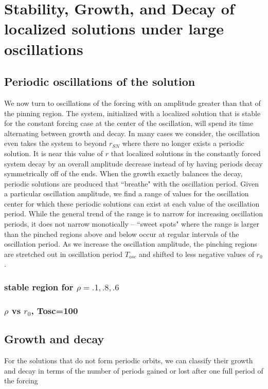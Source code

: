 \documentclass[../main/TimeForcingSHE.tex]{subfiles}
\begin{document}
\section{Stability, Growth, and Decay of localized solutions under large oscillations }
\subsection{Periodic oscillations of the solution}

We now turn to oscillations of the forcing with an amplitude greater than that of the pinning region.   The system,  initialized with a localized solution that is stable for the constant forcing case at the center of the oscillation, will spend its time alternating between growth and decay.  In many cases we consider, the oscillation even takes the system to beyond $r_{SN}$ where there no longer exists a periodic solution.  It is near this value of $r$ that localized solutions in the constantly forced system decay by an overall amplitude decrease instead of by having periods decay symmetrically off of the ends.     When the growth exactly balances the decay, periodic solutions are produced that ``breathe" with the oscillation period. Given a particular oscillation amplitude, we find a range of values for the oscillation center for which these periodic solutions can exist at each value of the oscillation period.  While the general trend of the range is to narrow for increasing oscillation periods, it does not narrow monotically -- ``sweet spots" where the range is larger than the pinched regions above and below occur at regular intervals of the oscillation period.  As we increase the oscillation amplitude, the  pinching regions are stretched out in oscillation period $T_{osc}$ and shifted to less negative values of $r_0$.  




\FIGvcmcompare



	\subsubsection{stable region for $\rho=.1,.8,.6$}
	\subsubsection{$\rho$ vs $r_0$, Tosc=100}

\subsection{Growth and decay}
For the solutions that do not form periodic orbits, we can classify their growth and decay in terms of the number of periods gained or lost after one full period of the forcing
\end{document}
